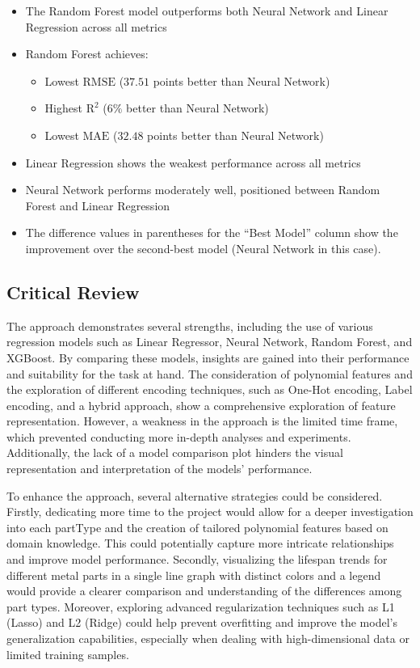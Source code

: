 \documentclass{article}
\begin{document}
\begin{itemize}
    \item The Random Forest model outperforms both Neural Network and Linear Regression across all metrics
    
    \item Random Forest achieves:
    \begin{itemize}
        \item Lowest $\text{RMSE}$ ($37.51$ points better than Neural Network)
        \item Highest $\text{R}^2$ ($6\%$ better than Neural Network)
        \item Lowest $\text{MAE}$ ($32.48$ points better than Neural Network)
    \end{itemize}
    
    \item Linear Regression shows the weakest performance across all metrics
    
    \item Neural Network performs moderately well, positioned between Random Forest and Linear Regression
    
    \item The difference values in parentheses for the ``Best Model'' column show the improvement over the second-best model (Neural Network in this case).
\end{itemize}

\subsection{Critical Review}

The approach demonstrates several strengths, including the use of various regression models such as Linear Regressor, Neural Network, Random Forest, and XGBoost. By comparing these models, insights are gained into their performance and suitability for the task at hand. The consideration of polynomial features and the exploration of different encoding techniques, such as One-Hot encoding, Label encoding, and a hybrid approach, show a comprehensive exploration of feature representation. However, a weakness in the approach is the limited time frame, which prevented conducting more in-depth analyses and experiments. Additionally, the lack of a model comparison plot hinders the visual representation and interpretation of the models' performance.

To enhance the approach, several alternative strategies could be considered. Firstly, dedicating more time to the project would allow for a deeper investigation into each partType and the creation of tailored polynomial features based on domain knowledge. This could potentially capture more intricate relationships and improve model performance. Secondly, visualizing the lifespan trends for different metal parts in a single line graph with distinct colors and a legend would provide a clearer comparison and understanding of the differences among part types. Moreover, exploring advanced regularization techniques such as L1 (Lasso) and L2 (Ridge) could help prevent overfitting and improve the model's generalization capabilities, especially when dealing with high-dimensional data or limited training samples.
\end{document}
